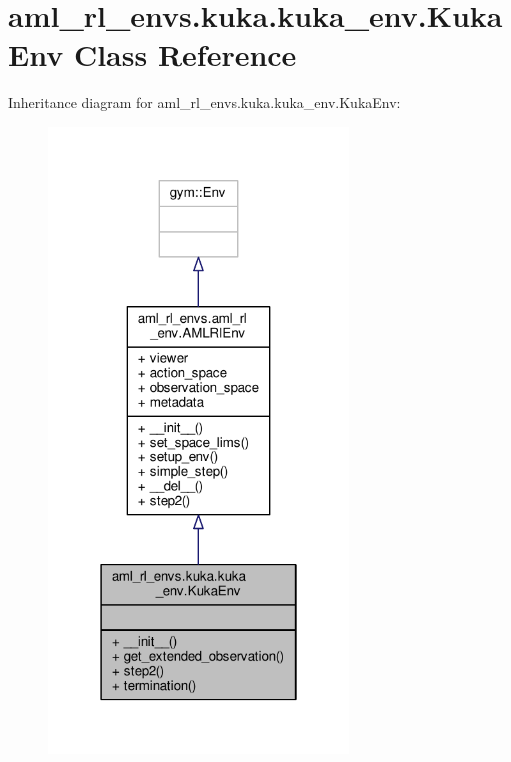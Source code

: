 \hypertarget{classaml__rl__envs_1_1kuka_1_1kuka__env_1_1_kuka_env}{\section{aml\-\_\-rl\-\_\-envs.\-kuka.\-kuka\-\_\-env.\-Kuka\-Env Class Reference}
\label{classaml__rl__envs_1_1kuka_1_1kuka__env_1_1_kuka_env}
}


Inheritance diagram for aml\-\_\-rl\-\_\-envs.\-kuka.\-kuka\-\_\-env.\-Kuka\-Env\-:
\nopagebreak
\begin{figure}[H]
\begin{center}
\leavevmode
\includegraphics[width=226pt]{classaml__rl__envs_1_1kuka_1_1kuka__env_1_1_kuka_env__inherit__graph}
\end{center}
\end{figure}


